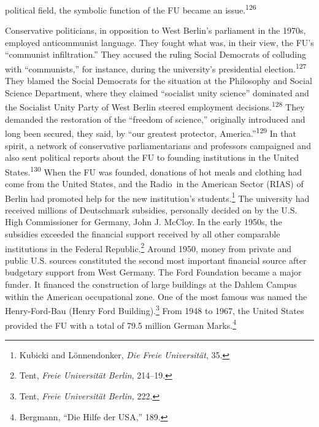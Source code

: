 \documentclass{tufte-handout}
\begin{document}
political field, the symbolic function of the FU became an
issue.\textsuperscript{126}

Conservative politicians, in opposition to West Berlin's parliament in
the 1970s, employed anticommunist language. They fought what was, in
their view, the FU's ``communist infiltration.'' They accused the ruling
Social Democrats of colluding with ``communists,'' for instance, during
the university's presidential election.\textsuperscript{127} They blamed the Social
Democrats for the situation at the Philosophy and Social Science
Department, where they claimed ``socialist unity science'' dominated and
the Socialist Unity Party of West Berlin steered employment
decisions.\textsuperscript{128} They demanded the restoration of the ``freedom of
science,'' originally introduced and long been secured, they said, by
``our greatest protector, America.''\textsuperscript{129} In that spirit, a network of
conservative parliamentarians and professors campaigned and also sent
political reports about the FU to founding institutions in the United
States.\textsuperscript{130} When the FU was founded, donations of hot
meals and clothing had come from the United States, and the Radio~in
the American Sector (RIAS) of Berlin had promoted help for the new institution's students.\footnote{Kubicki and Lönnendonker, \emph{Die
  Freie Universität}, 35.} The university had received millions of
Deutschmark subsidies, personally decided on by the U.S. High
Commissioner for Germany, John J. McCloy. In the early 1950s, the
subsidies exceeded the financial support received by all other
comparable institutions in the Federal Republic.\footnote{Tent,
  \emph{Freie Universität Berlin}, 214--19.} Around 1950, money from
private and public U.S. sources constituted the second most important
financial source after budgetary support from West Germany. The Ford
Foundation became a major funder. It financed the construction of large
buildings at the Dahlem Campus within the American occupational zone.
One of the most famous was named the Henry-Ford-Bau (Henry Ford
Building).\footnote{Tent, \emph{Freie Universität Berlin,} 222.} From
1948 to 1967, the United States provided the FU with a total of 79.5
million German Marks.\footnote{Bergmann, ``Die Hilfe der USA,'' 189.}
\end{document}
